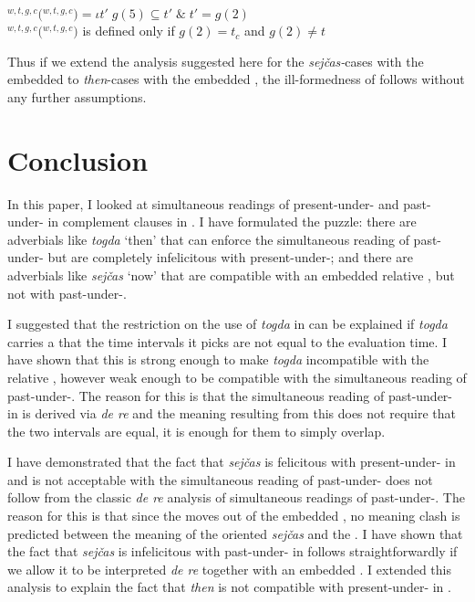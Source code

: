 \documentclass[output=paper,modfonts,newtxmath,hidelinks]{langscibook}
\begin{document}
\ea {}$^{w,t,g,c}($$^{w,t,g,c})=\iota t'\;g(5)\subseteq t'\;\&\;t'=g(2)$\smallskip\\
$^{w,t,g,c}($$^{w,t,g,c})$ is defined only if $g(2)=t_c$ and $g(2)\neq t$\label{20:ex55}
\z

\noindent Thus if we extend the analysis suggested here for the  \textit{sejčas-}cases with the embedded  to  \textit{then}{}-cases with the embedded , the ill-formedness of  follows without any further assumptions.


\section{Conclusion}\label{20:sConclusion}

In this paper, I looked at simultaneous readings of present-under- and past-under- in complement clauses in . I have formulated the  puzzle: there are adverbials like \textit{togda} `then' that can enforce the simultaneous reading of past-under- but are completely infelicitous with present-under-; and there are adverbials like \textit{sejčas} `now' that are compatible with an embedded relative , but not with past-under-.

I suggested that the restriction on the use of \textit{togda} in  can be explained if \textit{togda} carries a  that the time intervals it picks are not equal to the evaluation time. I have shown that this  is strong enough to make \textit{togda} incompatible with the relative , however weak enough to be compatible with the simultaneous reading of past-under-. The reason for this is that the simultaneous reading of past-under- in  is derived via \textit{de re}  and the meaning resulting from this  does not require that the two intervals are equal, it is enough for them to simply overlap.

I have demonstrated that the fact that \textit{sejčas} is felicitous with present-under- in  and is not acceptable with the simultaneous reading of past-under- does not follow from the classic \textit{de re} analysis of simultaneous readings of past-under-. The reason for this is that since the  moves out of the embedded , no meaning clash is predicted between the meaning of the  oriented  \textit{sejčas} and the . I have shown that the fact that \textit{sejčas} is infelicitous with past-under- in  follows straightforwardly if we allow it to be interpreted \textit{de re} together with an embedded . I extended this analysis to explain the fact that \textit{then} is not compatible with present-under- in .\largerpage[-2]
\end{document}

